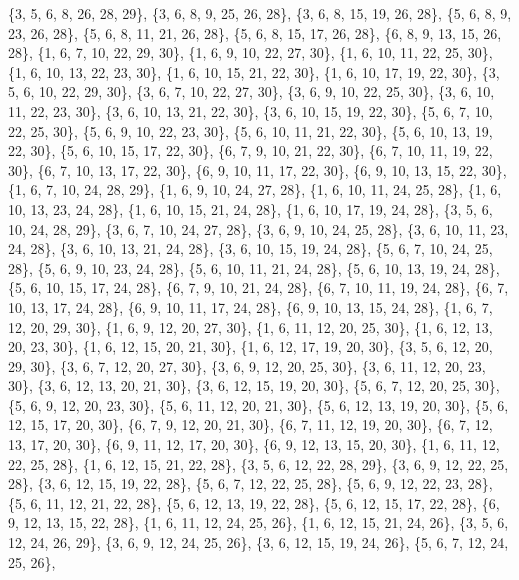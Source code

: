 \documentclass[11pt,a4paper]{article}
\begin{document}
{\{3, 5, 6, 8, 26, 28, 29\}, \{3, 6, 8, 9, 25, 26, 28\}, \{3, 6, 8, 15, 19, 26, 28\}, \{5, 6, 8, 9, 23, 26, 28\}, \{5, 6, 8, 11, 21, 26, 28\},
\{5, 6, 8, 15, 17, 26, 28\}, \{6, 8, 9, 13, 15, 26, 28\}, \{1, 6, 7, 10, 22, 29, 30\}, \{1, 6, 9, 10, 22, 27, 30\}, \{1, 6, 10, 11, 22, 25, 30\},
\{1, 6, 10, 13, 22, 23, 30\}, \{1, 6, 10, 15, 21, 22, 30\}, \{1, 6, 10, 17, 19, 22, 30\}, \{3, 5, 6, 10, 22, 29, 30\}, \{3, 6, 7, 10, 22, 27, 30\},
\{3, 6, 9, 10, 22, 25, 30\}, \{3, 6, 10, 11, 22, 23, 30\}, \{3, 6, 10, 13, 21, 22, 30\}, \{3, 6, 10, 15, 19, 22, 30\}, \{5, 6, 7, 10, 22, 25, 30\},
\{5, 6, 9, 10, 22, 23, 30\}, \{5, 6, 10, 11, 21, 22, 30\}, \{5, 6, 10, 13, 19, 22, 30\}, \{5, 6, 10, 15, 17, 22, 30\}, \{6, 7, 9, 10, 21, 22, 30\},
\{6, 7, 10, 11, 19, 22, 30\}, \{6, 7, 10, 13, 17, 22, 30\}, \{6, 9, 10, 11, 17, 22, 30\}, \{6, 9, 10, 13, 15, 22, 30\}, \{1, 6, 7, 10, 24, 28, 29\},
\{1, 6, 9, 10, 24, 27, 28\}, \{1, 6, 10, 11, 24, 25, 28\}, \{1, 6, 10, 13, 23, 24, 28\}, \{1, 6, 10, 15, 21, 24, 28\}, \{1, 6, 10, 17, 19, 24, 28\},
\{3, 5, 6, 10, 24, 28, 29\}, \{3, 6, 7, 10, 24, 27, 28\}, \{3, 6, 9, 10, 24, 25, 28\}, \{3, 6, 10, 11, 23, 24, 28\}, \{3, 6, 10, 13, 21, 24, 28\},
\{3, 6, 10, 15, 19, 24, 28\}, \{5, 6, 7, 10, 24, 25, 28\}, \{5, 6, 9, 10, 23, 24, 28\}, \{5, 6, 10, 11, 21, 24, 28\}, \{5, 6, 10, 13, 19, 24, 28\},
\{5, 6, 10, 15, 17, 24, 28\}, \{6, 7, 9, 10, 21, 24, 28\}, \{6, 7, 10, 11, 19, 24, 28\}, \{6, 7, 10, 13, 17, 24, 28\}, \{6, 9, 10, 11, 17, 24, 28\},
\{6, 9, 10, 13, 15, 24, 28\}, \{1, 6, 7, 12, 20, 29, 30\}, \{1, 6, 9, 12, 20, 27, 30\}, \{1, 6, 11, 12, 20, 25, 30\}, \{1, 6, 12, 13, 20, 23, 30\},
\{1, 6, 12, 15, 20, 21, 30\}, \{1, 6, 12, 17, 19, 20, 30\}, \{3, 5, 6, 12, 20, 29, 30\}, \{3, 6, 7, 12, 20, 27, 30\}, \{3, 6, 9, 12, 20, 25, 30\},
\{3, 6, 11, 12, 20, 23, 30\}, \{3, 6, 12, 13, 20, 21, 30\}, \{3, 6, 12, 15, 19, 20, 30\}, \{5, 6, 7, 12, 20, 25, 30\}, \{5, 6, 9, 12, 20, 23, 30\},
\{5, 6, 11, 12, 20, 21, 30\}, \{5, 6, 12, 13, 19, 20, 30\}, \{5, 6, 12, 15, 17, 20, 30\}, \{6, 7, 9, 12, 20, 21, 30\}, \{6, 7, 11, 12, 19, 20, 30\},
\{6, 7, 12, 13, 17, 20, 30\}, \{6, 9, 11, 12, 17, 20, 30\}, \{6, 9, 12, 13, 15, 20, 30\}, \{1, 6, 11, 12, 22, 25, 28\}, \{1, 6, 12, 15, 21, 22, 28\},
\{3, 5, 6, 12, 22, 28, 29\}, \{3, 6, 9, 12, 22, 25, 28\}, \{3, 6, 12, 15, 19, 22, 28\}, \{5, 6, 7, 12, 22, 25, 28\}, \{5, 6, 9, 12, 22, 23, 28\},
\{5, 6, 11, 12, 21, 22, 28\}, \{5, 6, 12, 13, 19, 22, 28\}, \{5, 6, 12, 15, 17, 22, 28\}, \{6, 9, 12, 13, 15, 22, 28\}, \{1, 6, 11, 12, 24, 25, 26\},
\{1, 6, 12, 15, 21, 24, 26\}, \{3, 5, 6, 12, 24, 26, 29\}, \{3, 6, 9, 12, 24, 25, 26\}, \{3, 6, 12, 15, 19, 24, 26\}, \{5, 6, 7, 12, 24, 25, 26\},
}
\end{document}
